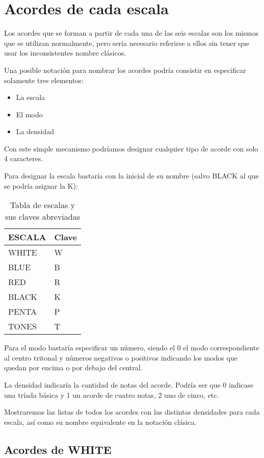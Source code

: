 \documentclass[]{report}
\begin{document}
\section{Acordes de cada escala}

Los acordes que se forman a partir de cada una de las seis escalas son los mismos que se utilizan normalmente, pero sería necesario referirse a ellos sin tener que usar los inconsistentes nombre clásicos. 

Una posible notación para nombrar los acordes podría consistir en especificar solamente tres elementos:
\begin{itemize}
  \item La escala
  \item El modo
  \item La densidad
\end{itemize}
Con este simple mecanismo podríamos designar cualquier tipo de acorde con solo 4 caracteres.

Para designar la escala bastaría con la inicial de su nombre (salvo \textsf{BLACK} al que se podría asignar la \textsf{K}):
\begin{table}[H]
  \centering
  \begin{tabular}{ll}
    \toprule
    ESCALA & Clave \\
    \midrule
    \textsf{WHITE} & W \\
    \textsf{BLUE}  & B \\
    \textsf{RED}   & R \\
    \textsf{BLACK} & K \\
    \textsf{PENTA} & P \\
    \textsf{TONES} & T \\
    \bottomrule
  \end{tabular}
  \caption{Tabla de escalas y sus claves abreviadas}\label{tab:scales-and-keys}
\end{table}

Para el modo bastaría especificar un número, siendo el 0 el modo correspondiente al centro tritonal y números negativos o positivos indicando los modos que quedan por encima o por debajo del central. 

La densidad indicaría la cantidad de notas del acorde. Podría ser que 0 indicase una tríada básica y 1 un acorde de cuatro notas, 2 uno de cinco, etc.

Mostraremos las listas de todos los acordes con las distintas densidades para cada escala, así como su nombre equivalente en la notación clásica.
\subsection*{Acordes de WHITE}
\end{document}
